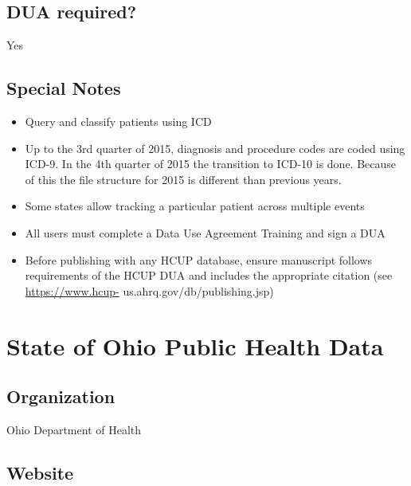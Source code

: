 \documentclass[
]{book}
\providecommand{\tightlist}{%
  \setlength{\itemsep}{0pt}\setlength{\parskip}{0pt}}
\begin{document}
\hypertarget{dua-required-84}{%
\section{DUA required?}\label{dua-required-84}}

Yes

\hypertarget{special-notes-84}{%
\section{Special Notes}\label{special-notes-84}}

\begin{itemize}
\tightlist
\item
  Query and classify patients using ICD
\item
  Up to the 3rd quarter of 2015, diagnosis and procedure codes are coded using ICD-9. In the 4th quarter of 2015 the transition to ICD-10 is done. Because of this the file structure for 2015 is different than previous years.
\item
  Some states allow tracking a particular patient across multiple events
\item
  All users must complete a Data Use Agreement Training and sign a DUA
\item
  Before publishing with any HCUP database, ensure manuscript follows requirements of the HCUP DUA and includes the appropriate citation (see \url{https://www.hcup-} us.ahrq.gov/db/publishing.jsp)
\end{itemize}

\mainmatter

\hypertarget{state-of-ohio-public-health-data}{%
\chapter{State of Ohio Public Health Data}\label{state-of-ohio-public-health-data}}

\hypertarget{organization-85}{%
\section{Organization}\label{organization-85}}

Ohio Department of Health

\hypertarget{website-85}{%
\section{Website}\label{website-85}}
\end{document}
